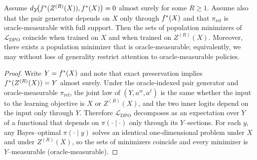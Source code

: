 \begin{theorem}\label{thm:dpo-exact}
Assume $d_{\mathcal{Y}}\!\big(f^{\ast}(Z^{(R)}(X)),f^{\ast}(X)\big)=0$ almost surely for some $R\ge1$. Assume also that the pair generator depends on $X$ only through $f^{\ast}(X)$ and that $\pi_{\mathrm{ref}}$ is oracle‑measurable with full support. Then the sets of population minimizers of $\mathcal L_{\mathrm{DPO}}$ coincide when trained on $X$ and when trained on $Z^{(R)}(X)$. Moreover, there exists a population minimizer that is oracle‑measurable; equivalently, we may without loss of generality restrict attention to oracle‑measurable policies.
\end{theorem}

\begin{proof}
Write $Y=f^{\ast}(X)$ and note that exact preservation implies $f^{\ast}(Z^{(R)}(X))=Y$ almost surely. Under the oracle‑indexed pair generator and oracle‑measurable $\pi_{\mathrm{ref}}$, the joint law of $(Y,a^w,a^\ell)$ is the same whether the input to the learning objective is $X$ or $Z^{(R)}(X)$, and the two inner logits depend on the input only through $Y$. Therefore $\mathcal L_{\mathrm{DPO}}$ decomposes as an expectation over $Y$ of a functional that depends on $\pi(\cdot\mid\cdot)$ only through its $Y$–sections. For each $y$, any Bayes–optimal $\pi(\cdot\mid y)$ solves an identical one‑dimensional problem under $X$ and under $Z^{(R)}(X)$, so the sets of minimizers coincide and every minimizer is $Y$–measurable (oracle‑measurable).
\end{proof}

